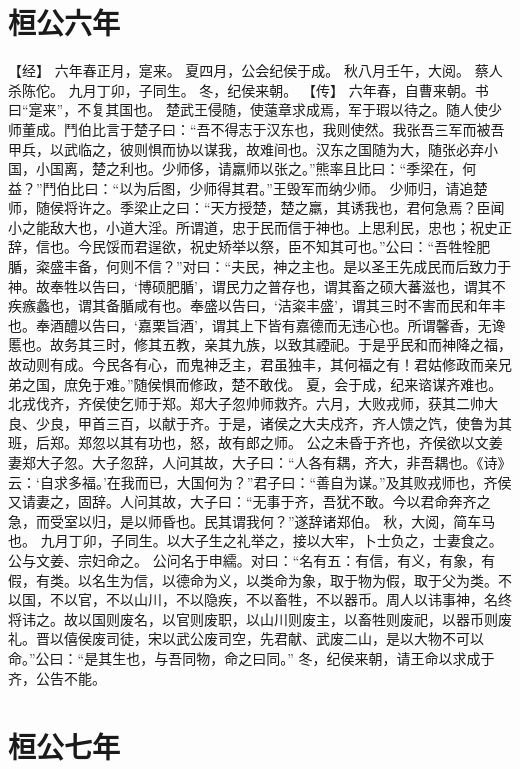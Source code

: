 \documentclass[a4paper,12pt,UTF8,twoside]{ctexbook}
\begin{document}
\chapter{桓公六年}

【经】
六年春正月，寔来。
夏四月，公会纪侯于成。
秋八月壬午，大阅。
蔡人杀陈佗。
九月丁卯，子同生。
冬，纪侯来朝。
【传】
六年春，自曹来朝。书曰“寔来”，不复其国也。
楚武王侵随，使薳章求成焉，军于瑕以待之。随人使少师董成。鬥伯比言于楚子曰：“吾不得志于汉东也，我则使然。我张吾三军而被吾甲兵，以武临之，彼则惧而协以谋我，故难间也。汉东之国随为大，随张必弃小国，小国离，楚之利也。少师侈，请羸师以张之。”熊率且比曰：“季梁在，何益？”鬥伯比曰：“以为后图，少师得其君。”王毁军而纳少师。
少师归，请追楚师，随侯将许之。季梁止之曰：“天方授楚，楚之羸，其诱我也，君何急焉？臣闻小之能敌大也，小道大淫。所谓道，忠于民而信于神也。上思利民，忠也；祝史正辞，信也。今民馁而君逞欲，祝史矫举以祭，臣不知其可也。”公曰：“吾牲牷肥腯，粢盛丰备，何则不信？”对曰：“夫民，神之主也。是以圣王先成民而后致力于神。故奉牲以告曰，‘博硕肥腯’，谓民力之普存也，谓其畜之硕大蕃滋也，谓其不疾瘯蠡也，谓其备腯咸有也。奉盛以告曰，‘洁粢丰盛’，谓其三时不害而民和年丰也。奉酒醴以告曰，‘嘉栗旨酒’，谓其上下皆有嘉德而无违心也。所谓馨香，无谗慝也。故务其三时，修其五教，亲其九族，以致其禋祀。于是乎民和而神降之福，故动则有成。今民各有心，而鬼神乏主，君虽独丰，其何福之有！君姑修政而亲兄弟之国，庶免于难。”随侯惧而修政，楚不敢伐。
夏，会于成，纪来谘谋齐难也。
北戎伐齐，齐侯使乞师于郑。郑大子忽帅师救齐。六月，大败戎师，获其二帅大良、少良，甲首三百，以献于齐。于是，诸侯之大夫戍齐，齐人馈之饩，使鲁为其班，后郑。郑忽以其有功也，怒，故有郎之师。
公之未昏于齐也，齐侯欲以文姜妻郑大子忽。大子忽辞，人问其故，大子曰：“人各有耦，齐大，非吾耦也。《诗》云：‘自求多福。’在我而已，大国何为？”君子曰：“善自为谋。”及其败戎师也，齐侯又请妻之，固辞。人问其故，大子曰：“无事于齐，吾犹不敢。今以君命奔齐之急，而受室以归，是以师昏也。民其谓我何？”遂辞诸郑伯。
秋，大阅，简车马也。
九月丁卯，子同生。以大子生之礼举之，接以大牢，卜士负之，士妻食之。公与文姜、宗妇命之。
公问名于申繻。对曰：“名有五：有信，有义，有象，有假，有类。以名生为信，以德命为义，以类命为象，取于物为假，取于父为类。不以国，不以官，不以山川，不以隐疾，不以畜牲，不以器币。周人以讳事神，名终将讳之。故以国则废名，以官则废职，以山川则废主，以畜牲则废祀，以器币则废礼。晋以僖侯废司徒，宋以武公废司空，先君献、武废二山，是以大物不可以命。”公曰：“是其生也，与吾同物，命之曰同。”
冬，纪侯来朝，请王命以求成于齐，公告不能。

\chapter{桓公七年}
\end{document}
